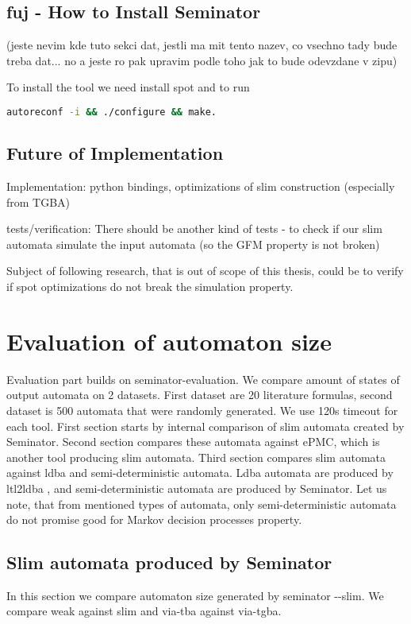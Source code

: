 \documentclass[
	digital,
nolof, nolot
]{fithesis3}
\begin{document}
	
	\section{fuj - How to Install Seminator}
	(jeste nevim kde tuto sekci dat, jestli ma mit tento nazev, co vsechno tady bude treba dat... no a jeste ro pak upravim podle toho jak to bude odevzdane v zipu)
	
	To install the tool we need install spot and to run 
	
	\begin{lstlisting}[language=bash]
autoreconf -i && ./configure && make.
	\end{lstlisting}
	\section{Future of Implementation}
	Implementation:
	python bindings, optimizations of slim construction (especially from TGBA)
	
	
	
	tests/verification:
	There should be another kind of tests - to check if our slim automata simulate the input automata (so the GFM property is not broken)
	
	Subject of following research, that is out of scope of this thesis, could be to verify if spot optimizations do not break the simulation property. 
	
	\chapter{Evaluation of automaton size}
	Evaluation part builds on seminator-evaluation. We compare amount of states of output automata on 2 datasets. First dataset are 20 literature formulas, second dataset is 500 automata that were randomly generated. We use 120s timeout for each tool. First section starts by internal comparison of slim automata created by Seminator. Second section compares these automata against ePMC, which is another tool producing slim automata. Third section compares slim automata against ldba and semi-deterministic automata. Ldba automata are produced by ltl2ldba \cite{ltl2ldba}, and semi-deterministic automata are produced by Seminator. Let us note, that from mentioned types of automata, only semi-deterministic automata do not promise good for Markov decision processes property.
	
	\section{Slim automata produced by Seminator}
	In this section we compare automaton size generated by seminator -{}-slim.
	We compare weak against slim and via-tba against via-tgba.
\end{document}
